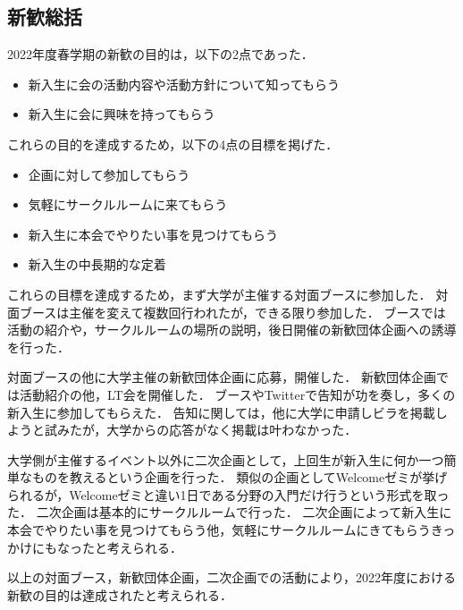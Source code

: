 \subsection*{新歓総括}


2022年度春学期の新歓の目的は，以下の2点であった．

\begin{itemize}
    \item 新入生に会の活動内容や活動方針について知ってもらう
    \item 新入生に会に興味を持ってもらう
\end{itemize}

これらの目的を達成するため，以下の4点の目標を掲げた．

\begin{itemize}
    \item 企画に対して参加してもらう
    \item 気軽にサークルルームに来てもらう
    \item 新入生に本会でやりたい事を見つけてもらう
    \item 新入生の中長期的な定着
\end{itemize}

これらの目標を達成するため，まず大学が主催する対面ブースに参加した．
対面ブースは主催を変えて複数回行われたが，できる限り参加した．
ブースでは活動の紹介や，サークルルームの場所の説明，後日開催の新歓団体企画への誘導を行った．

対面ブースの他に大学主催の新歓団体企画に応募，開催した．
新歓団体企画では活動紹介の他，LT会を開催した．
ブースやTwitterで告知が功を奏し，多くの新入生に参加してもらえた．
告知に関しては，他に大学に申請しビラを掲載しようと試みたが，大学からの応答がなく掲載は叶わなかった．

大学側が主催するイベント以外に二次企画として，上回生が新入生に何か一つ簡単なものを教えるという企画を行った．
類似の企画としてWelcomeゼミが挙げられるが，Welcomeゼミと違い1日である分野の入門だけ行うという形式を取った．
二次企画は基本的にサークルルームで行った．
二次企画によって新入生に本会でやりたい事を見つけてもらう他，気軽にサークルルームにきてもらうきっかけにもなったと考えられる．

以上の対面ブース，新歓団体企画，二次企画での活動により，2022年度における新歓の目的は達成されたと考えられる．
